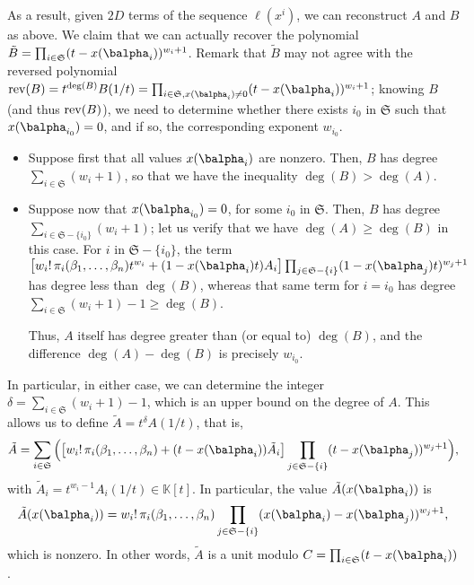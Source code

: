 \documentclass[12pt]{article}
\def\K {\ensuremath{\mathbb{K}}}
\def\K{\mathbb{K}}
\begin{document}
As a result, given $2D$ terms of the sequence $\ell(x^i)$, we can
reconstruct $A$ and $B$ as above. We claim that we can actually
recover the polynomial $\tilde B = \prod_{i \in
	\mathfrak{S}}(t-x(\balpha_i) )^{w_{i}+1}$.  Remark that $\tilde B$
may not agree with the reversed polynomial ${\rm rev}(B)=t^{\deg(B)}
B(1/t) = \prod_{i \in \mathfrak{S}, x(\balpha_i)\ne 0}(t-x(\balpha_i)
)^{w_{i}+1}$; knowing $B$ (and thus ${\rm rev}(B)$), we need to
determine whether there exists $i_0$ in $\mathfrak{S}$ such that
$x(\balpha_{i_0})=0$, and if so, the corresponding exponent $w_{i_0}$.

\begin{itemize}
	\item Suppose first that all values $x(\balpha_i)$ are nonzero.  Then,
	$B$ has degree $\sum_{i \in \mathfrak{S}} (w_i+1)$, so that we have
	the inequality $\deg(B) > \deg(A)$.
	\item Suppose now that $x(\balpha_{i_0})=0$, for some $i_0$ in
	$\mathfrak{S}$. Then, $B$ has degree $\sum_{i \in
		\mathfrak{S}-\{i_0\}} (w_i+1)$; let us verify that we have $\deg(A)
	\ge \deg(B)$ in this case.  For $i$ in $ \mathfrak{S}-\{i_0\}$, the
	term $\big[ w_i!\, \pi_{i}(\beta_1,\dots,\beta_n) t^{w_i} +
	(1-x(\balpha_i) t)A_i\big] \prod_{j \in
		\mathfrak{S}-\{i\}}(1-x(\balpha_j) t)^{w_{j}+1}$ has degree less
	than $\deg(B)$, whereas that same term for $i=i_0$ has degree
	$\sum_{i \in \mathfrak{S}} (w_i+1)-1 \ge \deg(B)$.
	
	Thus, $A$ itself has degree greater than (or equal to) $\deg(B)$,
	and the difference $\deg(A)-\deg(B)$ is precisely $w_{i_0}$.
\end{itemize}
In particular, in either case, we can determine the integer $\delta=\sum_{i \in \mathfrak{S}} (w_i+1)-1$,
which is an upper bound on the degree of $A$.
This allows us to define $\tilde A = t^{\delta}A(1/t)$, that is,
$$\tilde A = 
\sum_{i \in \mathfrak{S}} \Big(\big[
w_i!\, \pi_{i}(\beta_1,\dots,\beta_n) + (t-x(\balpha_i)  )\tilde A_i\big]
\prod_{j \in \mathfrak{S}-\{i\}}(t-x(\balpha_j) )^{w_{j}+1}\Big),$$
with $\tilde A_i = t^{w_i-1} A_i(1/t) \in \K[t]$. In particular, 
the value $\tilde A(x(\balpha_i))$ is 
$$\tilde A(x(\balpha_i))= w_i!\, \pi_{i}(\beta_1,\dots,\beta_n)\prod_{j \in
	\mathfrak{S}-\{i\}}(x(\balpha_i)-x(\balpha_j) )^{w_{j}+1},$$ which is
nonzero. In other words, $\tilde A$ is a unit modulo $C= \prod_{i \in
	\mathfrak{S}}(t-x(\balpha_i) )$.
\end{document}
